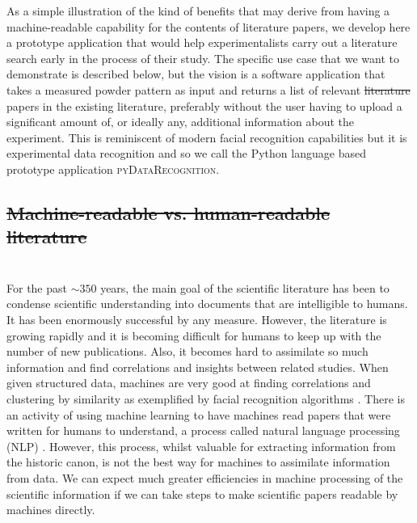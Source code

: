 \documentclass[preprint]{iucr}
\newcommand{\pydr}{\textsc{pyDataRecognition}\xspace}
\providecommand{\DIFadd}[1]{{\protect\color{blue}\uwave{#1}}} %
\providecommand{\DIFdel}[1]{{\protect\color{red}\sout{#1}}}                      %
\providecommand{\DIFaddbegin}{} %
\providecommand{\DIFaddend}{} %
\providecommand{\DIFdelbegin}{} %
\providecommand{\DIFdelend}{} %
\newcommand{\DIFscaledelfig}{0.5}
\newlength{\DIFdelgraphicswidth} %
\newlength{\DIFdelgraphicsheight} %
\newcommand{\DIFaddincludegraphics}[2][]{{\color{blue}\fbox{\DIFOincludegraphics[#1]{#2}}}} %
\newcommand{\DIFdelincludegraphics}[2][]{%
\sbox{\DIFdelgraphicsbox}{\DIFOincludegraphics[#1]{#2}}%
\settoboxwidth{\DIFdelgraphicswidth}{\DIFdelgraphicsbox} %
\settoboxtotalheight{\DIFdelgraphicsheight}{\DIFdelgraphicsbox} %
\scalebox{\DIFscaledelfig}{%
\parbox[b]{\DIFdelgraphicswidth}{\usebox{\DIFdelgraphicsbox}\\[-\baselineskip] \rule{\DIFdelgraphicswidth}{0em}}\llap{\resizebox{\DIFdelgraphicswidth}{\DIFdelgraphicsheight}{%
\setlength{\unitlength}{\DIFdelgraphicswidth}%
\begin{picture}(1,1)%
\thicklines\linethickness{2pt} %
{\color[rgb]{1,0,0}\put(0,0){\framebox(1,1){}}}%
{\color[rgb]{1,0,0}\put(0,0){\line( 1,1){1}}}%
{\color[rgb]{1,0,0}\put(0,1){\line(1,-1){1}}}%
\end{picture}%
}\hspace*{3pt}}} %
} %
\DeclareRobustCommand{\DIFaddbegin}{\DIFOaddbegin \let\includegraphics\DIFaddincludegraphics} %
\DeclareRobustCommand{\DIFaddend}{\DIFOaddend \let\includegraphics\DIFOincludegraphics} %
\DeclareRobustCommand{\DIFdelbegin}{\DIFOdelbegin \let\includegraphics\DIFdelincludegraphics} %
\DeclareRobustCommand{\DIFdelend}{\DIFOaddend \let\includegraphics\DIFOincludegraphics} %
\begin{document}
As a simple illustration of the kind of benefits that may derive from having a machine-readable capability for the contents of literature papers, we develop here a prototype application that would help experimentalists carry out a literature search early in the process of their study.  The specific use case that we want to demonstrate is described below, but the vision is a software  application that takes a measured powder pattern as input and returns a list of relevant \DIFdelbegin \DIFdel{literature }\DIFdelend papers in the existing literature, preferably without the user having to upload a significant amount of, or ideally any, additional information about the experiment. This is reminiscent of modern facial recognition capabilities but it is experimental data recognition and so we call the Python language based prototype application \pydr.


\DIFdelbegin \subsection{\DIFdel{Machine-readable vs. human-readable literature}}
\addtocounter{subsection}{-1}%
\DIFdelend \DIFaddbegin \section{\DIFadd{Machine-readable vs. human-readable literature}}
\DIFaddend 

For the past $\sim 350$   years, the main goal of the scientific literature has been to condense scientific understanding into documents that are intelligible to humans.  It has been enormously successful by any measure.  However, the literature is growing rapidly and it is becoming difficult for humans to keep up with the number of new publications.  Also, it becomes hard to assimilate so much information and find correlations and insights between related studies.  When given structured data, machines are very good at finding correlations and clustering by similarity as exemplified by facial recognition algorithms \cite{anwarulComprehensiveReviewFace2020}.  There is an activity of using machine learning to have machines read papers that were written for humans to understand, a process called natural language processing (NLP) \cite{chowdharyNaturalLanguageProcessing2020}.  However, this process, whilst valuable for extracting information from the historic canon, is not the best way for machines to assimilate information from data.  We can expect much greater efficiencies in machine processing of the scientific information if we can take steps to make scientific papers readable by machines directly.
\end{document}
